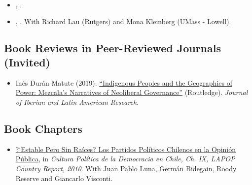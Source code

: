 \begin{itemize}
  	\item[\textcolor{gray}{\textbullet}] \href{https://raw.githubusercontent.com/hbahamonde/Negative_Link_Paper/master/abstract.txt}{\unskip}, {\bf \emph{\unskip}}. 

  	\item[\textcolor{gray}{\textbullet}] \href{https://raw.githubusercontent.com/hbahamonde/Running_Tally/master/abstract.txt}{\unskip}, {\bf \emph{\unskip}}. With Richard Lau (Rutgers) and Mona Kleinberg (UMass - Lowell). 






\end{itemize}




\subsection*{Book Reviews in Peer-Reviewed Journals (Invited)}

\begin{itemize}
	\item[\textcolor{gray}{\textbullet}] In\'es Dur\'an Matute (2019). \href{https://doi.org/10.1080/13260219.2019.1671679}{``Indigenous Peoples and the Geographies of Power: Mezcala's Narratives of Neoliberal Governance''} (Routledge). \emph{Journal of Iberian and Latin American Research}. %
\end{itemize}

\subsection*{Book Chapters}

\begin{itemize}
\item[\textcolor{gray}{\textbullet}] \href{http://www.vanderbilt.edu/lapop/chile/Chile-2010-cultura-politica.pdf}{?`Estable Pero Sin Ra\'ices? Los Partidos Pol\'iticos Chilenos en la Opini\'on P\'ublica}, in \emph{Cultura Pol\'itica de la Democracia en Chile, Ch. IX, LAPOP Country Report, 2010}. With Juan Pablo Luna, Germ\'an Bidegain, Roody Reserve and Giancarlo Visconti.
\end{itemize}



